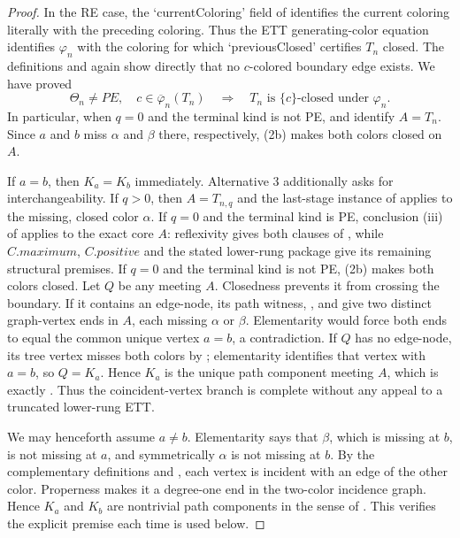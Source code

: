 \begin{proof}
In the RE case, the `currentColoring' field of
 identifies the current coloring literally
with the preceding coloring.  Thus the ETT generating-color equation
identifies $\varphi_n$ with the coloring for which `previousClosed'
certifies $T_n$ closed.  The definitions
 and  again
show directly that no $c$-colored boundary edge exists.  We have proved
\[
 \Theta_n\ne PE,\quad c\in\overline\varphi_n(T_n)
 \quad\Longrightarrow\quad
 T_n\text{ is }\{c\}\text{-closed under }\varphi_n.          \tag{2b}
\]
In particular, when $q=0$ and the terminal kind is not PE,
 and  identify
$A=T_n$.  Since $a$ and $b$ miss $\alpha$ and $\beta$ there, respectively,
(2b) makes both colors closed on $A$.

If $a=b$, then $K_a=K_b$ immediately.  Alternative 3 additionally asks
for interchangeability.  If $q>0$, then $A=T_{n,q}$ and the last-stage
instance of  applies to the missing, closed color
$\alpha$.  If $q=0$ and the terminal kind is PE, conclusion (iii) of
 applies to the exact core $A$: reflexivity gives
both clauses of , while
$C.\mathit{maximum}$, $C.\mathit{positive}$ and the stated lower-rung
package give its remaining structural premises.  If $q=0$ and the
terminal kind is not PE, (2b) makes both colors closed.  Let $Q$ be any
 meeting $A$.  Closedness prevents it
from crossing the boundary.  If it contains an edge-node, its path
witness, , and
 give two distinct graph-vertex
ends in $A$, each missing $\alpha$ or $\beta$.  Elementarity would force
both ends to equal the common unique vertex $a=b$, a contradiction.  If
$Q$ has no edge-node, its tree vertex misses both colors by
; elementarity identifies that vertex with
$a=b$, so $Q=K_a$.  Hence $K_a$ is the unique path component meeting
$A$, which is exactly .  Thus the
coincident-vertex branch is complete without any appeal to a truncated
lower-rung ETT.

We may henceforth assume $a\ne b$.  Elementarity says that $\beta$,
which is missing at $b$, is not missing at $a$, and symmetrically
$\alpha$ is not missing at $b$.  By the complementary definitions
 and , each vertex is
incident with an edge of the other color.  Properness makes it a
degree-one end in the two-color incidence graph.  Hence $K_a$ and $K_b$
are nontrivial path components in the sense of
.  This verifies the explicit
 premise each time
 is used below.                             


\end{proof}
